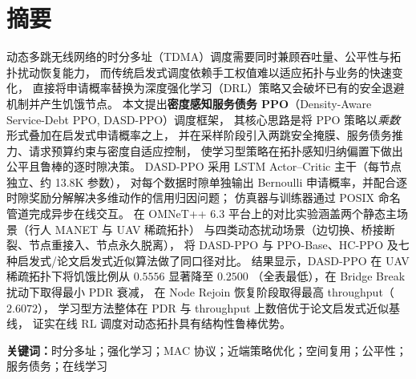 \section*{摘要}

\noindent
动态多跳无线网络的时分多址（TDMA）调度需要同时兼顾吞吐量、公平性与拓扑扰动恢复能力，
而传统启发式调度依赖手工权值难以适应拓扑与业务的快速变化，
直接将申请概率替换为深度强化学习（DRL）策略又会破坏已有的安全退避机制并产生饥饿节点。
本文提出\textbf{密度感知服务债务 PPO}（Density-Aware Service-Debt PPO, DASD-PPO）调度框架，
其核心思路是将 PPO 策略以\emph{乘数}形式叠加在启发式申请概率之上，
并在采样阶段引入两跳安全掩膜、服务债务推力、请求预算约束与密度自适应控制，
使学习型策略在拓扑感知归纳偏置下做出公平且鲁棒的逐时隙决策。
DASD-PPO 采用 LSTM Actor--Critic 主干（每节点独立、约 13.8K 参数），
对每个数据时隙单独输出 Bernoulli 申请概率，并配合逐时隙奖励分解解决多维动作的信用归因问题；
仿真器与训练器通过 POSIX 命名管道完成异步在线交互。
在 OMNeT++ 6.3 平台上的对比实验涵盖两个静态主场景（行人 MANET 与 UAV 稀疏拓扑）
与四类动态扰动场景（边切换、桥接断裂、节点重接入、节点永久脱离），
将 DASD-PPO 与 PPO-Base、HC-PPO 及七种启发式/论文启发式近似算法做了同口径对比。
结果显示，DASD-PPO 在 UAV 稀疏拓扑下将饥饿比例从 \(0.5556\) 显著降至 \(\mathbf{0.2500}\)
（全表最低），在 Bridge Break 扰动下取得最小 PDR 衰减，
在 Node Rejoin 恢复阶段取得最高 throughput（\(2.6072\)），
学习型方法整体在 PDR 与 throughput 上数倍优于论文启发式近似基线，
证实在线 RL 调度对动态拓扑具有结构性鲁棒优势。

\vspace{0.5em}
\noindent\textbf{关键词：}时分多址；强化学习；MAC 协议；近端策略优化；空间复用；公平性；服务债务；在线学习

